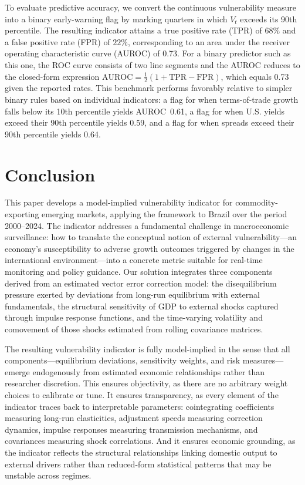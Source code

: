 \documentclass[12pt,a4paper]{article}
\numberwithin{equation}{section}
\theoremstyle{definition}
\theoremstyle{remark}
\begin{document}
To evaluate predictive accuracy, we convert the continuous vulnerability measure into a binary early-warning flag by marking quarters in which $V_t$ exceeds its 90th percentile. 
The resulting indicator attains a true positive rate (TPR) of $68\%$ and a false positive rate (FPR) of $22\%$, corresponding to an area under the receiver operating characteristic curve (AUROC) of 0.73. 
For a binary predictor such as this one, the ROC curve consists of two line segments and the AUROC reduces to the closed-form expression 
$\text{AUROC} = \tfrac{1}{2}(1 + \text{TPR} - \text{FPR})$, 
which equals 0.73 given the reported rates. 
This benchmark performs favorably relative to simpler binary rules based on individual indicators: a flag for when terms-of-trade growth falls below its 10th percentile yields AUROC~0.61, a flag for when U.S. yields exceed their 90th percentile yields 0.59, and a flag for when spreads exceed their 90th percentile yields 0.64.




\section{Conclusion}
\label{sec:conclusion}

This paper develops a model-implied vulnerability indicator for commodity-exporting emerging markets, applying the framework to Brazil over the period 2000--2024. The indicator addresses a fundamental challenge in macroeconomic surveillance: how to translate the conceptual notion of external vulnerability---an economy's susceptibility to adverse growth outcomes triggered by changes in the international environment---into a concrete metric suitable for real-time monitoring and policy guidance. Our solution integrates three components derived from an estimated vector error correction model: the disequilibrium pressure exerted by deviations from long-run equilibrium with external fundamentals, the structural sensitivity of GDP to external shocks captured through impulse response functions, and the time-varying volatility and comovement of those shocks estimated from rolling covariance matrices.

The resulting vulnerability indicator is fully model-implied in the sense that all components---equilibrium deviations, sensitivity weights, and risk measures---emerge endogenously from estimated economic relationships rather than researcher discretion. This ensures objectivity, as there are no arbitrary weight choices to calibrate or tune. It ensures transparency, as every element of the indicator traces back to interpretable parameters: cointegrating coefficients measuring long-run elasticities, adjustment speeds measuring correction dynamics, impulse responses measuring transmission mechanisms, and covariances measuring shock correlations. And it ensures economic grounding, as the indicator reflects the structural relationships linking domestic output to external drivers rather than reduced-form statistical patterns that may be unstable across regimes.
\end{document}
